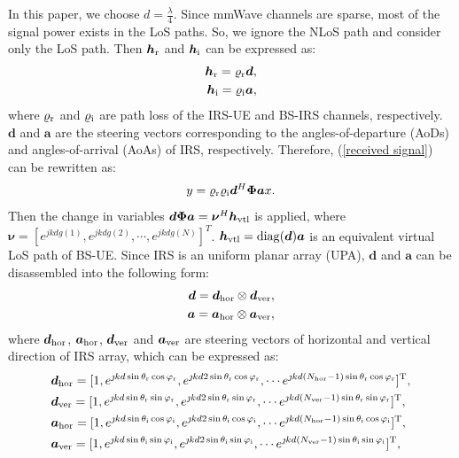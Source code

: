 \documentclass[12pt,draftclsnofoot,onecolumn]{IEEEtran}
\begin{document}
	In this paper, we choose $d=\frac{\lambda}{4}$. Since mmWave channels are sparse, most of the signal power exists in the LoS paths. So, we ignore the NLoS path and consider only the LoS path. Then ${\bm h}_{\rm r}$ and ${\bm h}_{\rm i}$ can be expressed as:
	\begin{align}
		{\bm h}_{\rm r}=\varrho_{\rm r} {\bm d},\\
		{\bm h}_{\rm i}=\varrho_{\rm i} {\bm a},
	\end{align}
	where $\varrho_{\rm r}$ and $\varrho_{\rm i}$ are path loss of the IRS-UE and BS-IRS channels, respectively. $\bm d$ and $\bm a$ are the steering vectors corresponding  to the angles-of-departure  (AoDs) and angles-of-arrival (AoAs) of IRS, respectively. Therefore, (\ref{received signal}) can be rewritten as:
	\begin{equation}\label{dphia}
		y=\varrho_{\rm r}\varrho_{\rm i}{\bm d}^H{\bm \Phi}{\bm a}x.
	\end{equation}
	Then the change in variables ${\bm d} {\bm \Phi}{\bm a}={\bm \nu}^H {\bm h}_{\rm vtl}$ is applied, where ${\bm \nu}=[e^{jkdg(1)}, e^{jkdg(2)}, \cdots, e^{jkdg(N)}]^T$. ${\bm h}_{\rm vtl}={\rm  diag}({\bm d}){\bm a}$ is an equivalent virtual LoS path of BS-UE. Since IRS is an uniform planar array (UPA), $\bm d$ and $\bm a$ can be disassembled into the following form:
	\begin{align}
		{\bm d}={\bm d}_{\rm hor}\otimes {\bm d}_{\rm ver},\\
		{\bm a}={\bm a}_{\rm hor}\otimes {\bm a}_{\rm ver},
	\end{align}
	where ${\bm d}_{\rm hor}$, ${\bm a}_{\rm hor}$, ${\bm d}_{\rm ver}$ and ${\bm a}_{\rm ver}$ are steering vectors of horizontal and vertical direction of IRS array, which can be expressed as:
		\begin{align}
			&{{\bm d}_{\rm hor}} = [1,{e^{{\jmath}kd\sin {\theta _{\rm r}}\cos {\varphi _{\rm r}}}},{e^{{\jmath}kd2\sin {\theta _{\rm r}}\cos {\varphi _{\rm r}}}}, \cdots {e^{{\jmath}kd(N_{\rm hor} - 1)\sin {\theta _{\rm r}}\cos {\varphi _{\rm r}}}}]^{\mathrm  T},\\
			&{{\bm d}_{\rm ver}} = [1,{e^{{\jmath}kd\sin {\theta _{\rm r}}\sin {\varphi _{\rm r}}}},{e^{{\jmath}kd2\sin {\theta _{\rm r}}\sin {\varphi _{\rm r}}}}, \cdots {e^{{\jmath}kd(N_{\rm ver} - 1)\sin {\theta _{\rm r}}\sin {\varphi _{\rm r}}}}]^{\mathrm  T},\\
			&{{\bm a}_{\rm hor}} = [1,{e^{{\jmath}kd\sin {\theta _{\rm i}}\cos {\varphi _{\rm i}}}},{e^{{\jmath}kd2\sin {\theta _{\rm i}}\cos {\varphi _{\rm i}}}}, \cdots {e^{{\jmath}kd(N_{\rm hor} - 1)\sin {\theta _{\rm i}}\cos {\varphi _{\rm i}}}}]^{\mathrm  T},\\
			&{{\bm a}_{\rm ver}} = [1,{e^{{\jmath}kd\sin {\theta _{\rm i}}\sin {\varphi _{\rm i}}}},{e^{{\jmath}kd2\sin {\theta _{\rm i}}\sin {\varphi _{\rm i}}}}, \cdots {e^{{\jmath}kd(N_{\rm ver} - 1)\sin {\theta _{\rm i}}\sin {\varphi _{\rm i}}}}]^{\mathrm  T},
		\end{align}
\end{document}
